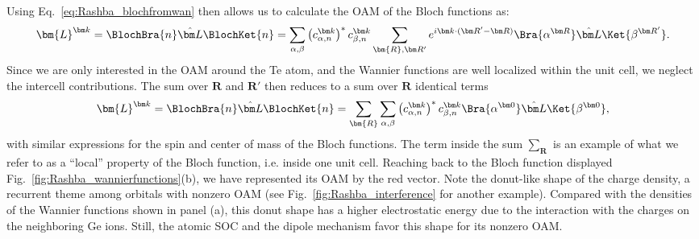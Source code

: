 Using Eq.~\eqref{eq:Rashba_blochfromwan} then allows us to calculate the \gls{OAM} of the Bloch functions as:
\begin{equation}
\bm{L}^{\bm k} = \BlochBra{n} \hat{\bm L} \BlochKet{n} = \sum_{\alpha,\beta}\left(c_{\alpha,n}^{\bm k}\right)^* c_{\beta,n}^{\bm k}\sum_{\bm{R}, \bm R'}e^{i \bm k \cdot (\bm R' - \bm R)}\Bra{\alpha^{\bm R}}\hat{\bm L} \Ket{\beta^{\bm R'}}.
\end{equation}
Since we are only interested in the \gls{OAM} around the Te atom, and the Wannier functions are well localized within the unit cell, we neglect the intercell contributions. The sum over $\bm R$ and $\bm R'$ then reduces to a sum over $\bm R$ identical terms
\begin{equation}
\bm{L}^{\bm k} = \BlochBra{n} \hat{\bm L} \BlochKet{n} =\sum_{\bm{R}} \sum_{\alpha,\beta}\left(c_{\alpha,n}^{\bm k}\right)^* c_{\beta,n}^{\bm k}\Bra{\alpha^{\bm 0}}\hat{\bm L} \Ket{\beta^{\bm 0}},
\end{equation}
with similar expressions for the spin and center of mass of the Bloch functions. The term inside the sum $\sum_{\bm R}$ is an example of what we refer to as a ``local'' property of the Bloch function, i.e. inside one unit cell. Reaching back to the Bloch function displayed Fig.~\ref{fig:Rashba_wannierfunctions}(b), we have represented its \gls{OAM} by the red vector. Note the donut-like shape of the charge density, a recurrent theme among orbitals with nonzero \gls{OAM} (see Fig.~\ref{fig:Rashba_interference} for another example). Compared with the densities of the Wannier functions shown in panel (a), this donut shape has a higher electrostatic energy due to the interaction with the charges on the neighboring Ge ions. Still, the atomic \gls{SOC} and the dipole mechanism favor this shape for its nonzero \gls{OAM}. 

